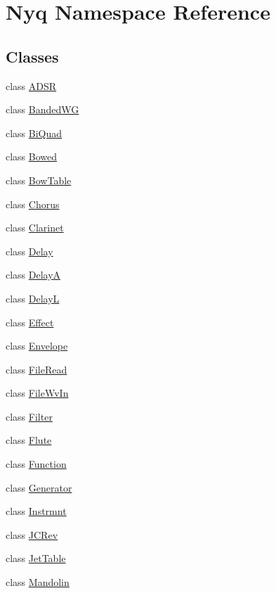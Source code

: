 \hypertarget{namespace_nyq}{}\section{Nyq Namespace Reference}
\label{namespace_nyq}
\subsection*{Classes}
\begin{DoxyCompactItemize}
\item 
class \hyperlink{class_nyq_1_1_a_d_s_r}{A\+D\+SR}
\item 
class \hyperlink{class_nyq_1_1_banded_w_g}{Banded\+WG}
\item 
class \hyperlink{class_nyq_1_1_bi_quad}{Bi\+Quad}
\item 
class \hyperlink{class_nyq_1_1_bowed}{Bowed}
\item 
class \hyperlink{class_nyq_1_1_bow_table}{Bow\+Table}
\item 
class \hyperlink{class_nyq_1_1_chorus}{Chorus}
\item 
class \hyperlink{class_nyq_1_1_clarinet}{Clarinet}
\item 
class \hyperlink{class_nyq_1_1_delay}{Delay}
\item 
class \hyperlink{class_nyq_1_1_delay_a}{DelayA}
\item 
class \hyperlink{class_nyq_1_1_delay_l}{DelayL}
\item 
class \hyperlink{class_nyq_1_1_effect}{Effect}
\item 
class \hyperlink{class_nyq_1_1_envelope}{Envelope}
\item 
class \hyperlink{class_nyq_1_1_file_read}{File\+Read}
\item 
class \hyperlink{class_nyq_1_1_file_wv_in}{File\+Wv\+In}
\item 
class \hyperlink{class_nyq_1_1_filter}{Filter}
\item 
class \hyperlink{class_nyq_1_1_flute}{Flute}
\item 
class \hyperlink{class_nyq_1_1_function}{Function}
\item 
class \hyperlink{class_nyq_1_1_generator}{Generator}
\item 
class \hyperlink{class_nyq_1_1_instrmnt}{Instrmnt}
\item 
class \hyperlink{class_nyq_1_1_j_c_rev}{J\+C\+Rev}
\item 
class \hyperlink{class_nyq_1_1_jet_table}{Jet\+Table}
\item 
class \hyperlink{class_nyq_1_1_mandolin}{Mandolin}

\end{DoxyCompactItemize}

